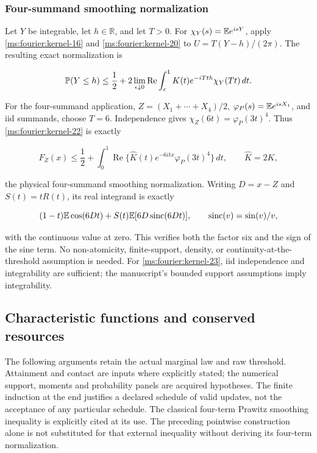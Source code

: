 \subsubsection{Four-summand smoothing normalization}

Let \(Y\) be integrable, let \(h\in\mathbb R\), and let \(T>0\). For
\(\chi_Y(s)=\mathbb E e^{isY}\), apply \eqref{ms:fourier:kernel-16} and \eqref{ms:fourier:kernel-20} to
\(U=T(Y-h)/(2\pi)\). The resulting exact normalization is

\begin{equation}
 \mathbb P(Y\le h)\le\frac12+
  2\lim_{\epsilon\downarrow0}\operatorname{Re}
       \int_\epsilon^1K(t)e^{-iTth}\chi_Y(Tt)\,dt.
 \label{ms:fourier:kernel-22}
\end{equation}

For the four-summand application,
\(Z=(X_1+\cdots+X_4)/2\), \(\varphi_P(s)=\mathbb E e^{isX_1}\),
and iid summands, choose \(T=6\). Independence gives
\(\chi_Z(6t)=\varphi_P(3t)^4\). Thus \eqref{ms:fourier:kernel-22} is exactly

\begin{equation}
 F_Z(x)\le\frac12+\int_0^1\operatorname{Re}
   \{\widehat K(t)e^{-6itx}\varphi_P(3t)^4\}\,dt,
 \qquad \widehat K=2K,
 \label{ms:fourier:kernel-23}
\end{equation}

the physical four-summand smoothing normalization. Writing \(D=x-Z\) and
\(S(t)=tR(t)\), its real integrand is exactly

\begin{equation}
 (1-t)\mathbb E\cos(6Dt)+S(t)\mathbb E[6D\operatorname{sinc}(6Dt)],
 \qquad \operatorname{sinc}(v)=\sin(v)/v,
 \label{ms:fourier:kernel-24}
\end{equation}

with the continuous value at zero. This verifies both the factor six
and the sign of the sine term. No non-atomicity, finite-support, density,
or continuity-at-the-threshold assumption is needed. For \eqref{ms:fourier:kernel-23}, iid
independence and integrability are sufficient; the manuscript's bounded
support assumptions imply integrability.

\subsection{Characteristic functions and conserved resources}
\label{ms:fourier:resources}

The following arguments retain the actual marginal law and raw threshold.
Attainment and contact are inputs where explicitly stated; the numerical
support, moments and probability panels are acquired hypotheses. The
finite induction at the end justifies a declared schedule of valid
updates, not the acceptance of any particular schedule. The classical
four-term Prawitz smoothing inequality is explicitly cited at its use.
The preceding pointwise construction alone is not substituted for that
external inequality without deriving its four-term normalization.

